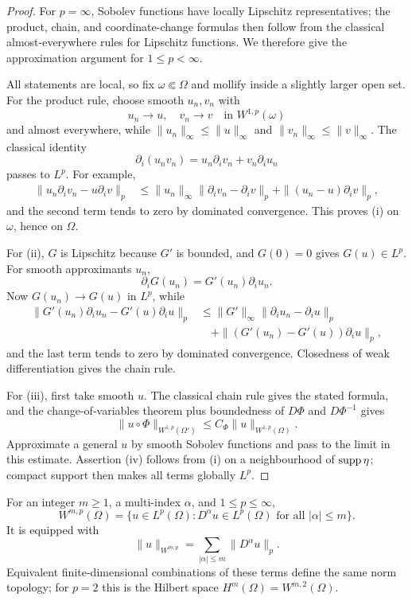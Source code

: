 \begin{proof}
For $p=\infty$, Sobolev functions have locally Lipschitz representatives; the
product, chain, and coordinate-change formulas then follow from the classical
almost-everywhere rules for Lipschitz functions.  We therefore give the
approximation argument for $1\le p<\infty$.

All statements are local, so fix $\omega\Subset\Omega$ and mollify inside a
slightly larger open set.  For the product rule, choose smooth
$u_n,v_n$ with
\[
  u_n\to u,
  \quad v_n\to v
  \quad\text{in }W^{1,p}(\omega)
\]
and almost everywhere, while
$\|u_n\|_\infty\le\|u\|_\infty$ and
$\|v_n\|_\infty\le\|v\|_\infty$.  The classical identity
\[
  \partial_i(u_nv_n)=u_n\partial_i v_n+v_n\partial_i u_n
\]
passes to $L^p$.  For example,
\[
\begin{aligned}
 \|u_n\partial_i v_n-u\partial_i v\|_p
 &\le\|u_n\|_\infty
       \|\partial_i v_n-\partial_i v\|_p
     +\|(u_n-u)\partial_i v\|_p,
\end{aligned}
\]
and the second term tends to zero by dominated convergence.  This proves (i)
on $\omega$, hence on $\Omega$.

For (ii), $G$ is Lipschitz because $G'$ is bounded, and $G(0)=0$ gives
$G(u)\in L^p$.  For smooth approximants $u_n$,
\[
  \partial_iG(u_n)=G'(u_n)\partial_i u_n.
\]
Now $G(u_n)\to G(u)$ in $L^p$, while
\[
\begin{aligned}
 \|G'(u_n)\partial_i u_n-G'(u)\partial_i u\|_p
 &\le\|G'\|_\infty
       \|\partial_i u_n-\partial_i u\|_p\\
 &\quad+
   \|(G'(u_n)-G'(u))\partial_i u\|_p,
\end{aligned}
\]
and the last term tends to zero by dominated convergence.  Closedness of weak
differentiation gives the chain rule.

For (iii), first take smooth $u$.  The classical chain rule gives the stated
formula, and the change-of-variables theorem plus boundedness of
$D\Phi$ and $D\Phi^{-1}$ gives
\[
  \|u\circ\Phi\|_{W^{1,p}(\Omega')}
  \le C_\Phi\|u\|_{W^{1,p}(\Omega)}.
\]
Approximate a general $u$ by smooth Sobolev functions and pass to the limit in
this estimate.  Assertion (iv) follows from (i) on a neighbourhood of
$\operatorname{supp}\eta$; compact support then makes all terms globally $L^p$.
\end{proof}

\begin{notedefinition}
For an integer $m\ge1$, a multi-index $\alpha$, and $1\le p\le\infty$,
\[
  W^{m,p}(\Omega)
  =\{u\in L^p(\Omega):D^\alpha u\in L^p(\Omega)
                      \text{ for all }|\alpha|\le m\}.
\]
It is equipped with
\[
  \|u\|_{W^{m,p}}
  =\sum_{|\alpha|\le m}\|D^\alpha u\|_p.
\]
Equivalent finite-dimensional combinations of these terms define the same
norm topology; for $p=2$ this is the Hilbert space
$H^m(\Omega)=W^{m,2}(\Omega)$.
\end{notedefinition}
